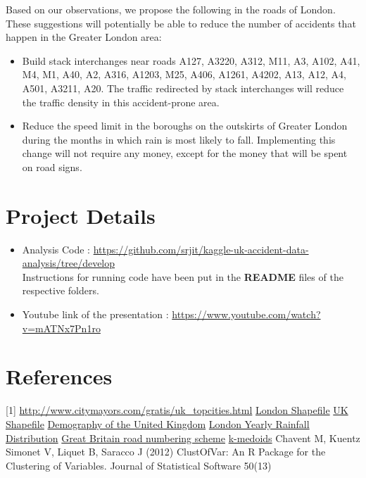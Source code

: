 \documentclass{neu_handout}
\begin{document}
Based on our observations, we propose the following in the roads of London.  These suggestions will potentially be able to reduce the number of accidents that happen in the Greater London area:

\begin{itemize}
\item{Build stack interchanges near roads A127, A3220, A312, M11, A3, A102, A41, M4, M1, A40, A2, A316, A1203, M25, A406, A1261, A4202, A13, A12, A4, A501, A3211, A20. The traffic redirected by stack interchanges will reduce the traffic density in this accident-prone area.}

\item{Reduce the speed limit in the boroughs on the outskirts of Greater London during the months in which rain is most likely to fall. Implementing this change will not require any money, except for the money that will be spent on road signs.}

\end{itemize}

\section{Project Details}
\begin{itemize}
\item Analysis Code : \url{https://github.com/srjit/kaggle-uk-accident-data-analysis/tree/develop} \\
  Instructions for running code have been put in the \textbf{README} files of the respective folders.
\item Youtube link of the presentation : \url{https://www.youtube.com/watch?v=mATNx7Pn1ro}  
\end{itemize}

\pagebreak

\section{References}
 [1] \url{http://www.citymayors.com/gratis/uk_topcities.html}
\newline
 [2] \href{https://data.london.gov.uk/dataset/statistical-gis-boundary-files-london}{London Shapefile}
 \newline
 [3] \href{http://www.naturalearthdata.com} {UK Shapefile}
 \newline
 [4] \href{https://en.wikipedia.org/wiki/Demography_of_the_United_Kingdom}{Demography of the United Kingdom}
 \newline
 [5] \href{http://projectbritain.com/climate.html}{London Yearly Rainfall Distribution}
 \newline
 [6] \href{https://en.wikipedia.org/wiki/Great_Britain_road_numbering_scheme}{Great Britain road numbering scheme}
 \newline
 [7] \href{https://en.wikipedia.org/wiki/K-medoids}{k-medoids}
 \newline
 [8] Chavent M, Kuentz Simonet V, Liquet B, Saracco J (2012) ClustOfVar: An R Package for the Clustering of Variables. Journal of Statistical Software 50(13)
\end{document}
